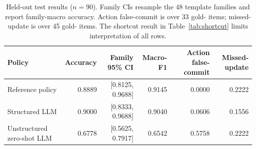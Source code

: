 \begin{table}[t]
\centering
\small
\caption{Held-out test results ($n{=}90$). Family CIs resample the 48
template families and report family-macro accuracy. Action false-commit is over 33
gold-\abstain{} items; missed-update is over 45 gold-\supersede{} items. The
shortcut result in Table~\ref{tab:shortcut} limits interpretation of all rows.}
\label{tab:main}
\begin{tabular}{@{}lrrrrr@{}}
\toprule
Policy & Accuracy & Family 95\% CI & Macro-F1 & Action false-commit & Missed-update \\
\midrule
Reference policy & 0.8889 & [0.8125, 0.9688] & 0.9145 & 0.0000 & 0.2222 \\
Structured LLM & 0.9000 & [0.8333, 0.9688] & 0.9040 & 0.0606 & 0.1556 \\
Unstructured zero-shot LLM & 0.6778 & [0.5625, 0.7917] & 0.6542 & 0.5758 & 0.2222 \\
\bottomrule
\end{tabular}
\end{table}
